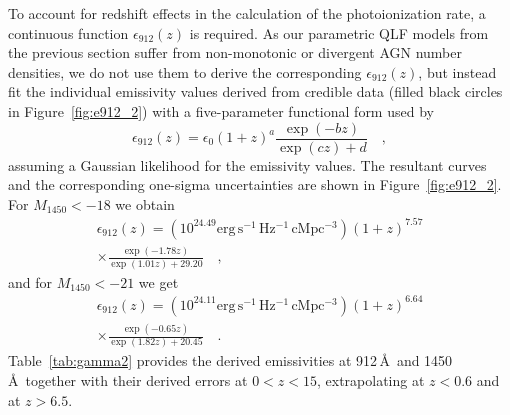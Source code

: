 \documentclass[fleqn,usenatbib]{mnras}
\begin{document}
To account for redshift effects in the calculation of the  photoionization rate,
a continuous function $\epsilon_{912}\left(z\right)$ is required. As our parametric QLF models
from the previous section suffer from non-monotonic or divergent AGN number densities,
we do not use them to derive the corresponding $\epsilon_{912}\left(z\right)$, but
instead fit the individual emissivity values derived from credible data
(filled black circles in Figure~\ref{fig:e912_2}) with a 
five-parameter functional form used by \citet{2012ApJ...746..125H}
\begin{equation}
  \epsilon_{912}\left(z\right)=\epsilon_0(1+z)^a\frac{\exp(-bz)}{\exp(cz)+d}\quad,
  \label{eqn:e912fit}
\end{equation}
assuming a Gaussian likelihood for the emissivity values.
The resultant curves and the corresponding one-sigma
uncertainties are shown in Figure~\ref{fig:e912_2}. For $M_{1450}<-18$
we obtain
\begin{multline}
  \epsilon_{912}\left(z\right)=\left(10^{24.49}\mathrm{erg\, s^{-1}\, Hz^{-1}\, cMpc^{-3}}\right)\left(1+z\right)^{7.57}\\\times\frac{\exp(-1.78z)}{\exp(1.01z)+29.20}\quad,
\end{multline}
 and for $M_{1450}<-21$ we get
\begin{multline}
  \epsilon_{912}\left(z\right)=\left(10^{24.11}\mathrm{erg\, s^{-1}\, Hz^{-1}\, cMpc^{-3}}\right)\left(1+z\right)^{6.64}\\\times\frac{\exp(-0.65z)}{\exp(1.82z)+20.45}\quad.
\end{multline}
Table~\ref{tab:gamma2} provides the derived emissivities at 912\,\AA\ and 1450\,\AA\ together with their
derived errors at $0<z<15$, extrapolating at $z<0.6$ and at $z>6.5$. 



\end{document}
